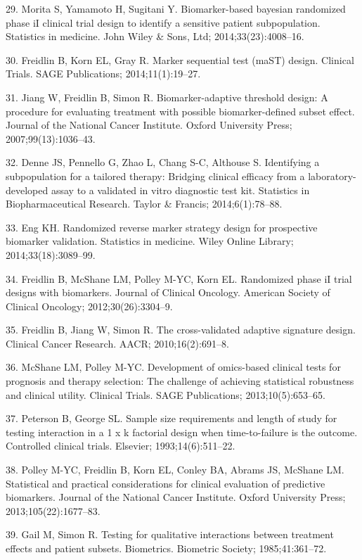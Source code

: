 \documentclass[11pt]{article}
\begin{document}
29. Morita S, Yamamoto H, Sugitani Y. Biomarker-based bayesian
randomized phase iI clinical trial design to identify a sensitive
patient subpopulation. Statistics in medicine. John Wiley \& Sons, Ltd;
2014;33(23):4008--16.

30. Freidlin B, Korn EL, Gray R. Marker sequential test (maST) design.
Clinical Trials. SAGE Publications; 2014;11(1):19--27.

31. Jiang W, Freidlin B, Simon R. Biomarker-adaptive threshold design: A
procedure for evaluating treatment with possible biomarker-defined
subset effect. Journal of the National Cancer Institute. Oxford
University Press; 2007;99(13):1036--43.

32. Denne JS, Pennello G, Zhao L, Chang S-C, Althouse S. Identifying a
subpopulation for a tailored therapy: Bridging clinical efficacy from a
laboratory-developed assay to a validated in vitro diagnostic test kit.
Statistics in Biopharmaceutical Research. Taylor \& Francis;
2014;6(1):78--88.

33. Eng KH. Randomized reverse marker strategy design for prospective
biomarker validation. Statistics in medicine. Wiley Online Library;
2014;33(18):3089--99.

34. Freidlin B, McShane LM, Polley M-YC, Korn EL. Randomized phase iI
trial designs with biomarkers. Journal of Clinical Oncology. American
Society of Clinical Oncology; 2012;30(26):3304--9.

35. Freidlin B, Jiang W, Simon R. The cross-validated adaptive signature
design. Clinical Cancer Research. AACR; 2010;16(2):691--8.

36. McShane LM, Polley M-YC. Development of omics-based clinical tests
for prognosis and therapy selection: The challenge of achieving
statistical robustness and clinical utility. Clinical Trials. SAGE
Publications; 2013;10(5):653--65.

37. Peterson B, George SL. Sample size requirements and length of study
for testing interaction in a 1 x k factorial design when time-to-failure
is the outcome. Controlled clinical trials. Elsevier;
1993;14(6):511--22.

38. Polley M-YC, Freidlin B, Korn EL, Conley BA, Abrams JS, McShane LM.
Statistical and practical considerations for clinical evaluation of
predictive biomarkers. Journal of the National Cancer Institute. Oxford
University Press; 2013;105(22):1677--83.

39. Gail M, Simon R. Testing for qualitative interactions between
treatment effects and patient subsets. Biometrics. Biometric Society;
1985;41:361--72.
\end{document}
